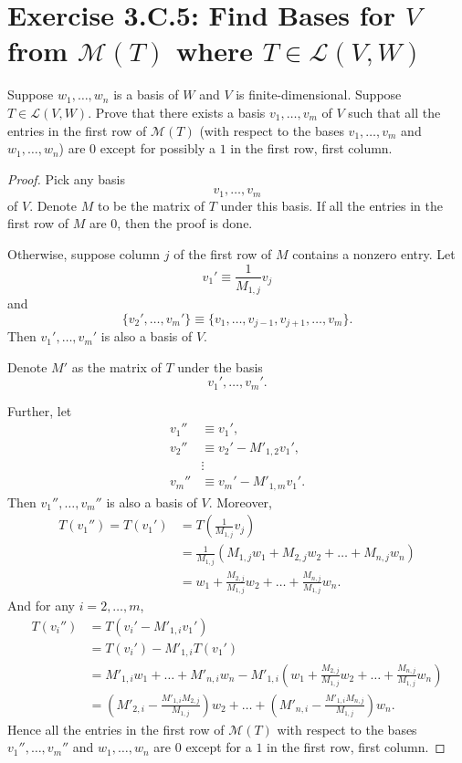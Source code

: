 \section{Exercise 3.C.5: Find Bases for $V$ from $\mathcal{M}(T)$ where $T\in\mathcal{L}(V,W)$}
\label{Exercise 3.C.5}
Suppose $w_1,\dots,w_n$ is a basis of $W$ and $V$ is finite-dimensional. Suppose $T\in\mathcal{L}(V,W)$. Prove that there exists a basis $v_1,\dots,v_m$ of $V$ such that all the entries in the first row of $\mathcal{M}(T)$ (with respect to the bases $v_1,\dots,v_m$ and $w_1,\dots,w_n$) are $0$ except for possibly a $1$ in the first row, first column.
\begin{proof}
Pick any basis\[
v_1,\dots,v_m
\]of $V$. Denote $M$ to be the matrix of $T$ under this basis. If all the entries in the first row of $M$ are $0$, then the proof is done.

Otherwise, suppose column $j$ of the first row of $M$ contains a nonzero entry. Let\[
v_1'\equiv \frac{1}{M_{1,j}}v_j
\]and\[
\{v_2',\dots,v_m'\}\equiv\{v_1,\dots,v_{j-1},v_{j+1},\dots,v_m\}.
\]Then $v_1',\dots,v_m'$ is also a basis of $V$.

Denote $M'$ as the matrix of $T$ under the basis\[
v_1',\dots,v_m'.
\]

Further, let\[
\begin{split}
v_1''&\equiv v_1',\\
v_2''&\equiv v_2'-M'_{1,2}v_1',\\
&\vdots\\
v_m''&\equiv v_m'-M'_{1,m}v_1'.
\end{split}
\]Then $v_1'',\dots,v_m''$ is also a basis of $V$. Moreover,\[
\begin{split}
T(v_1'')=T(v_1')&=T(\frac{1}{M_{1,j}}v_j)\\
&=\frac{1}{M_{1,j}}(M_{1,j}w_1+M_{2,j}w_2+\dots+M_{n,j}w_n)\\
&=w_1+\frac{M_{2,j}}{M_{1,j}}w_2+\dots+\frac{M_{n,j}}{M_{1,j}}w_n.
\end{split}
\]And for any $i=2,\dots,m$,\[
\begin{split}
T(v_i'')&=T(v_i'-M'_{1,i}v_1')\\
&=T(v_i')-M'_{1,i}T(v_1')\\
&=M'_{1,i}w_1+\dots+M'_{n,i}w_n-M'_{1,i}(w_1+\frac{M_{2,j}}{M_{1,j}}w_2+\dots+\frac{M_{n,j}}{M_{1,j}}w_n)\\
&=(M'_{2,i}-\frac{M'_{1,i}M_{2,j}}{M_{1,j}})w_2+\dots+(M'_{n,i}-\frac{M'_{1,i}M_{n,j}}{M_{1,j}})w_n.
\end{split}
\]Hence all the entries in the first row of $\mathcal{M}(T)$ with respect to the bases $v_1'',\dots,v_m''$ and $w_1,\dots,w_n$ are $0$ except for a $1$ in the first row, first column.
\end{proof}

